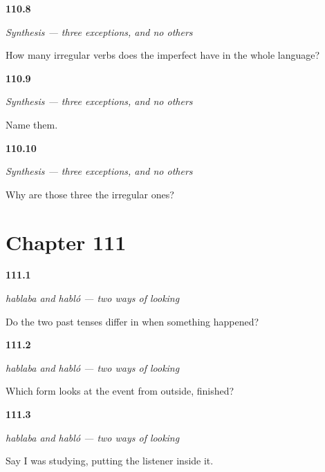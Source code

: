 \noindent\begin{minipage}[t]{\linewidth}
\raggedright
\hypertarget{review-ES-C16-sintesis-imperfecto-count}{\textbf{110.8}} \emph{Synthesis — three exceptions, and no others}\par
\small How many irregular verbs does the imperfect have in the whole language?
\end{minipage}\par\medskip

\noindent\begin{minipage}[t]{\linewidth}
\raggedright
\hypertarget{review-ES-C16-sintesis-imperfecto-which}{\textbf{110.9}} \emph{Synthesis — three exceptions, and no others}\par
\small Name them.
\end{minipage}\par\medskip

\noindent\begin{minipage}[t]{\linewidth}
\raggedright
\hypertarget{review-ES-C16-sintesis-imperfecto-why}{\textbf{110.10}} \emph{Synthesis — three exceptions, and no others}\par
\small Why are those three the irregular ones?
\end{minipage}\par\medskip

\section*{Chapter 111}

\noindent\begin{minipage}[t]{\linewidth}
\raggedright
\hypertarget{review-ES-C48-dos-miradas-which}{\textbf{111.1}} \emph{hablaba and habló — two ways of looking}\par
\small Do the two past tenses differ in when something happened?
\end{minipage}\par\medskip

\noindent\begin{minipage}[t]{\linewidth}
\raggedright
\hypertarget{review-ES-C48-dos-miradas-outside}{\textbf{111.2}} \emph{hablaba and habló — two ways of looking}\par
\small Which form looks at the event from outside, finished?
\end{minipage}\par\medskip

\noindent\begin{minipage}[t]{\linewidth}
\raggedright
\hypertarget{review-ES-C48-dos-miradas-inside}{\textbf{111.3}} \emph{hablaba and habló — two ways of looking}\par
\small Say I was studying, putting the listener inside it.
\end{minipage}\par\medskip

